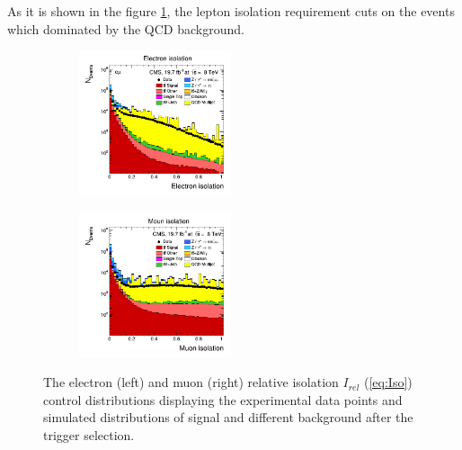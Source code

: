 \begin{itemize}
 As it is shown in the figure \ref{fig:PFIso}, the lepton isolation requirement cuts on the events which dominated by the QCD background.

 \begin{figure}[h]
 \centering
 \begin{subfigure}
   \centering
   \includegraphics[width=0.49\textwidth]{04_event_reconstruction/plots/PF_e_Iso.png}
 \end{subfigure}
 \begin{subfigure}
   \centering
   \includegraphics[width=0.49\textwidth]{04_event_reconstruction/plots/PF_mu_Iso.png}
 \end{subfigure}
 \caption{The electron (left) and muon (right) relative isolation $I_{rel}$ (\ref{eq:Iso}) control distributions displaying the experimental data points
 and simulated distributions of signal and different background after the trigger selection.}
 \label{fig:PFIso}
 \end{figure}
 

\end{itemize}

